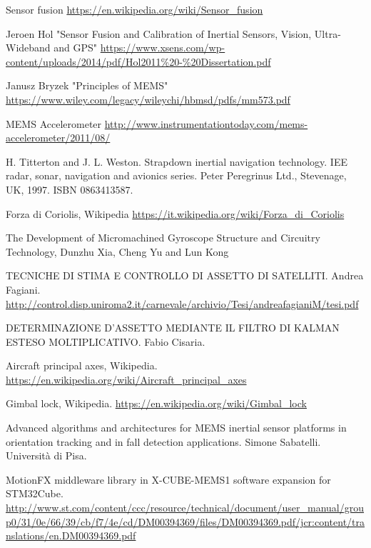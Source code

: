 \begin{thebibliography}{99}
Sensor fusion
\url{https://en.wikipedia.org/wiki/Sensor_fusion}

Jeroen Hol "Sensor Fusion and Calibration of
Inertial Sensors, Vision,
Ultra-Wideband and GPS"
\url{https://www.xsens.com/wp-content/uploads/2014/pdf/Hol2011%20-%20Dissertation.pdf}

Janusz Bryzek "Principles of MEMS"
\url{https://www.wiley.com/legacy/wileychi/hbmsd/pdfs/mm573.pdf}


MEMS Accelerometer
\url{http://www.instrumentationtoday.com/mems-accelerometer/2011/08/}


H. Titterton and J. L. Weston. Strapdown inertial navigation technology. IEE
radar, sonar, navigation and avionics series. Peter Peregrinus Ltd., Stevenage,
UK, 1997. ISBN 0863413587.

Forza di Coriolis, Wikipedia
\url{https://it.wikipedia.org/wiki/Forza_di_Coriolis}

The Development of Micromachined Gyroscope Structure and
Circuitry Technology, Dunzhu Xia, Cheng Yu and Lun Kong

TECNICHE DI STIMA E CONTROLLO DI ASSETTO DI
SATELLITI. Andrea Fagiani. 
\url{http://control.disp.uniroma2.it/carnevale/archivio/Tesi/andreafagianiM/tesi.pdf}

DETERMINAZIONE D'ASSETTO MEDIANTE
IL FILTRO DI KALMAN ESTESO
MOLTIPLICATIVO. Fabio Cisaria. 

Aircraft principal axes, Wikipedia.
\url{https://en.wikipedia.org/wiki/Aircraft_principal_axes}

Gimbal lock, Wikipedia.
\url{https://en.wikipedia.org/wiki/Gimbal_lock}

Advanced algorithms and architectures for MEMS inertial sensor platforms 
in orientation tracking and in fall detection applications. Simone Sabatelli.
Università di Pisa.

MotionFX middleware library in X-CUBE-MEMS1 software
expansion for STM32Cube.\\
\url{http://www.st.com/content/ccc/resource/technical/document/user_manual/group0/31/0e/66/39/cb/f7/4e/cd/DM00394369/files/DM00394369.pdf/jcr:content/translations/en.DM00394369.pdf}


\end{thebibliography}



